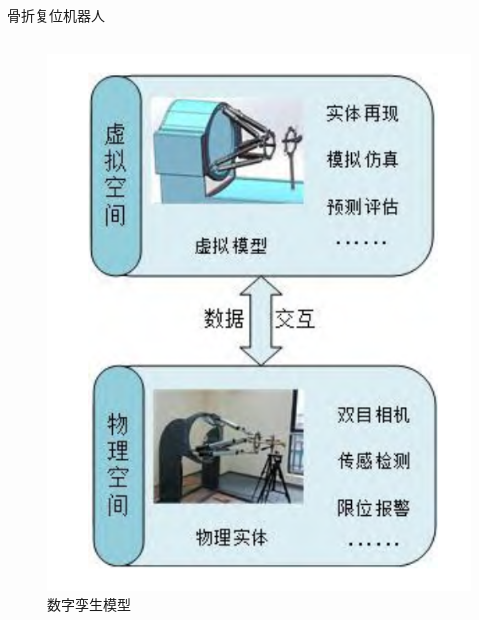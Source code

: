 \documentclass[notheorems, aspectratio=54]{beamer}
\begin{document}
\begin{frame}{骨折复位机器人}
\begin{columns}
\begin{figure}[htbp]
		\includegraphics[scale=0.5]{figure2.png}
		\caption{数字孪生模型}
		\label{figure 2}
	\end{figure}
    \end{columns}
\end{frame}
\end{document}
